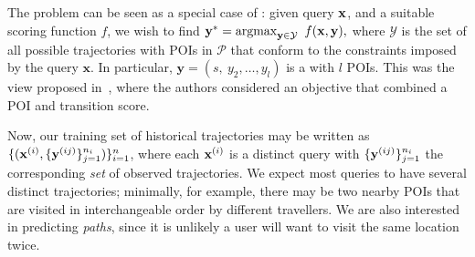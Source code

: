 The {\trajrec} problem can be seen as a special case of {\seqrec}:
given {\trajectory} query $\mathbf{x}$, and a suitable scoring function $f$, we wish to find
$\mathbf{y}^* = \operatorname*{argmax}_{\mathbf{y} \in \mathcal{Y}}~f(\mathbf{x}, \mathbf{y}),$
where $\mathcal{Y}$ is the set of all possible trajectories with POIs in $\mathcal{P}$ that conform to the constraints imposed by the query $\mathbf{x}$.
In particular,
$\mathbf{y} = (s,~ y_2, \dots, y_l)$ is a {\trajectory} with $l$ POIs. %
This was the view proposed in~\cite{cikm16paper}, where the authors considered an
objective that combined a POI and transition score.

Now, our training set of historical trajectories may be written as
$\{ ( \mathbf{x}^{({i})}, \{ \mathbf{y}^{({ij})} \}_{j=1}^{n_i} ) \}_{i=1}^{n}$,
where each $\mathbf{x}^{({i})}$ is a distinct query
with $\{ \mathbf{y}^{({ij})} \}_{j=1}^{n_i}$ the corresponding \emph{set} of observed trajectories.
We expect most queries to have several distinct trajectories;
minimally,
for example,
there may be two nearby POIs that are visited in interchangeable order by different travellers.
We are also interested in predicting \emph{paths}, %
since it is unlikely a user will want to visit the same location twice.





